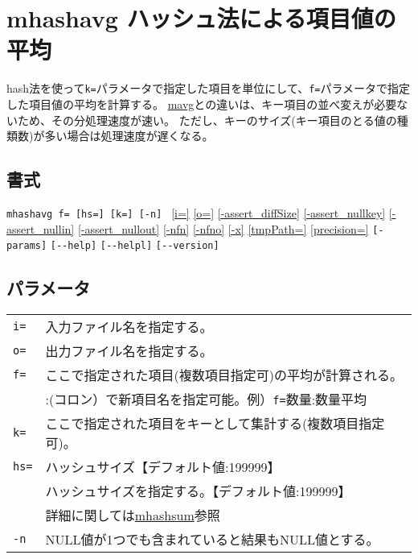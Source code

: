 
%

\section{mhashavg ハッシュ法による項目値の平均\label{sect:mhashavg}}
hash法を使って\verb|k=|パラメータで指定した項目を単位にして、\verb|f=|パラメータで指定した項目値の平均を計算する。
\hyperref[sect:avg]{mavg}との違いは、キー項目の並べ変えが必要ないため、その分処理速度が速い。
ただし、キーのサイズ(キー項目のとる値の種類数)が多い場合は処理速度が遅くなる。

\subsection*{書式}
\verb|mhashavg f= [hs=] [k=] [-n] |
\hyperref[sect:option_i]{[i=]}
\hyperref[sect:option_o]{[o=]}
\hyperref[sect:option_assert_diffSize]{[-assert\_diffSize]}
\hyperref[sect:option_assert_nullkey]{[-assert\_nullkey]}
\hyperref[sect:option_assert_nullin]{[-assert\_nullin]}
\hyperref[sect:option_assert_nullout]{[-assert\_nullout]}
\hyperref[sect:option_nfn]{[-nfn]} 
\hyperref[sect:option_nfno]{[-nfno]}  
\hyperref[sect:option_x]{[-x]}
\hyperref[sect:option_option_tmppath]{[tmpPath=]}
\hyperref[sect:option_precision]{[precision=]}
\verb|[-params]|
\verb|[--help]|
\verb|[--helpl]|
\verb|[--version]|\\

\subsection*{パラメータ}
\begin{table}[htbp]
{\small
\begin{tabular}{ll}
\verb|i=|    & 入力ファイル名を指定する。\\
\verb|o=|    & 出力ファイル名を指定する。\\
\verb|f=|    & ここで指定された項目(複数項目指定可)の平均が計算される。\\
             & :(コロン）で新項目名を指定可能。例）\verb|f=|数量:数量平均\\
\verb|k=|    & ここで指定された項目をキーとして集計する(複数項目指定可)。\\
\verb|hs=|   & ハッシュサイズ【デフォルト値:199999】 \\
             & ハッシュサイズを指定する。【デフォルト値:199999】\\
             & 詳細に関しては\hyperref[sect:mhashsum]{mhashsum}参照 \\
\verb|-n|    & NULL値が1つでも含まれていると結果もNULL値とする。\\
\end{tabular} 
}
\end{table} 

